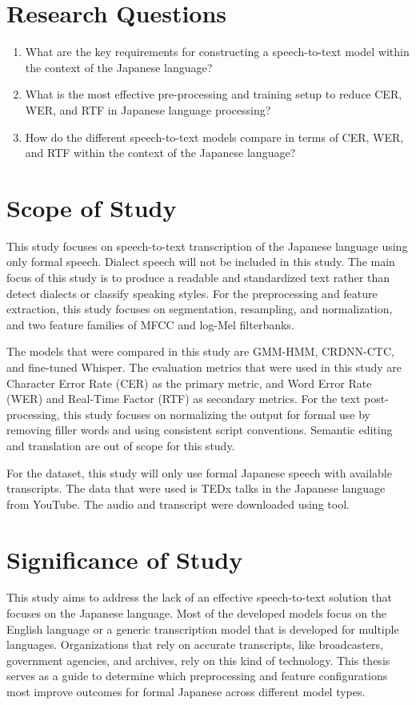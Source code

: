 \section{Research Questions}
\begin{enumerate}
    \item What are the key requirements for constructing a speech-to-text model within the context of the Japanese language?
    \item What is the most effective pre-processing and training setup to reduce CER, WER, and RTF in Japanese language processing?
    \item How do the different speech-to-text models compare in terms of CER, WER, and RTF within the context of the Japanese language?
\end{enumerate}

\section{Scope of Study}
This study focuses on speech-to-text transcription of the Japanese language using only formal speech. Dialect speech will not be included in this study. The main focus of this study is to produce a readable and standardized text rather than detect dialects or classify speaking styles. For the preprocessing and feature extraction, this study focuses on segmentation, resampling, and normalization, and two feature families of MFCC and log-Mel filterbanks.

The models that were compared in this study are GMM-HMM, CRDNN-CTC, and fine-tuned Whisper. The evaluation metrics that were used in this study are Character Error Rate (CER) as the primary metric, and Word Error Rate (WER) and Real-Time Factor (RTF) as secondary metrics. For the text post-processing, this study focuses on normalizing the output for formal use by removing filler words and using consistent script conventions. Semantic editing and translation are out of scope for this study.

For the dataset, this study will only use formal Japanese speech with available transcripts. The data that were used is TEDx talks in the Japanese language from YouTube. The audio and transcript were downloaded using \textcite{yt-dlp} tool.

\section{Significance of Study}
This study aims to address the lack of an effective speech-to-text solution that focuses on the Japanese language. Most of the developed models focus on the English language or a generic transcription model that is developed for multiple languages. Organizations that rely on accurate transcripts, like broadcasters, government agencies, and archives, rely on this kind of technology. This thesis serves as a guide to determine which preprocessing and feature configurations most improve outcomes for formal Japanese across different model types.

